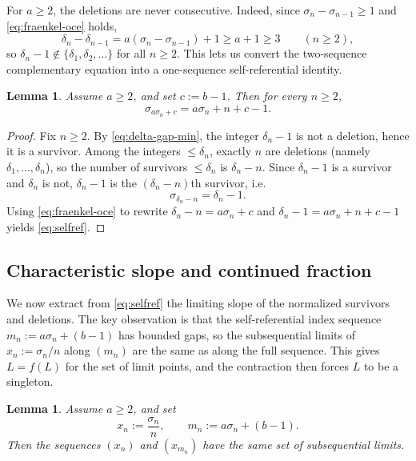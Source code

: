 \documentclass[11pt]{article}
\numberwithin{equation}{section}
\theoremstyle{plain}
\newtheorem{lemma}[theorem]{Lemma}
\theoremstyle{definition}
\theoremstyle{remark}
\begin{document}
For $a\ge2$, the deletions are never consecutive.  Indeed, since
$\sigma_{n}-\sigma_{n-1}\ge1$ and \eqref{eq:fraenkel-oce} holds,
\begin{equation}\label{eq:delta-gap-min}
  \delta_n-\delta_{n-1}=a(\sigma_n-\sigma_{n-1})+1 \ge a+1 \ge 3
  \qquad (n\ge2),
\end{equation}
so $\delta_n-1\notin\{\delta_1,\delta_2,\ldots\}$ for all $n\ge2$.
This lets us convert the two-sequence complementary equation into a one-sequence
self-referential identity.

\begin{lemma}\label{lem:selfref}
Assume $a\ge2$, and set $c:=b-1$. Then for every $n\ge2$,
\begin{equation}\label{eq:selfref}
  \sigma_{a\sigma_n+c} = a\sigma_n + n + c - 1.
\end{equation}
\end{lemma}

\begin{proof}
Fix $n\ge2$. By \eqref{eq:delta-gap-min}, the integer $\delta_n-1$ is not a
deletion, hence it is a survivor. Among the integers $\le \delta_n$, exactly
$n$ are deletions (namely $\delta_1,\ldots,\delta_n$), so the number of
survivors $\le \delta_n$ is $\delta_n-n$. Since $\delta_n-1$ is a survivor
and $\delta_n$ is not, $\delta_n-1$ is the $(\delta_n-n)$th survivor, i.e.
\[
  \sigma_{\delta_n-n}=\delta_n-1.
\]
Using \eqref{eq:fraenkel-oce} to rewrite $\delta_n-n=a\sigma_n+c$ and
$\delta_n-1=a\sigma_n+n+c-1$ yields \eqref{eq:selfref}.
\end{proof}

\subsection{Characteristic slope and continued fraction}

We now extract from \eqref{eq:selfref} the limiting slope of the normalized
survivors and deletions.  The key observation is that the self-referential
index sequence $m_n:=a\sigma_n+(b-1)$ has bounded gaps, so the subsequential
limits of $x_n:=\sigma_n/n$ along $(m_n)$ are the same as along the full
sequence.  This gives $L=f(L)$ for the set of limit points, and the
contraction then forces $L$ to be a singleton.

\begin{lemma}\label{lem:limit-set-same}
Assume $a\ge2$, and set
\[
  x_n:=\frac{\sigma_n}{n},
  \qquad
  m_n:=a\sigma_n+(b-1).
\]
Then the sequences $(x_n)$ and $(x_{m_n})$ have the same set of subsequential
limits.
\end{lemma}
\end{document}

